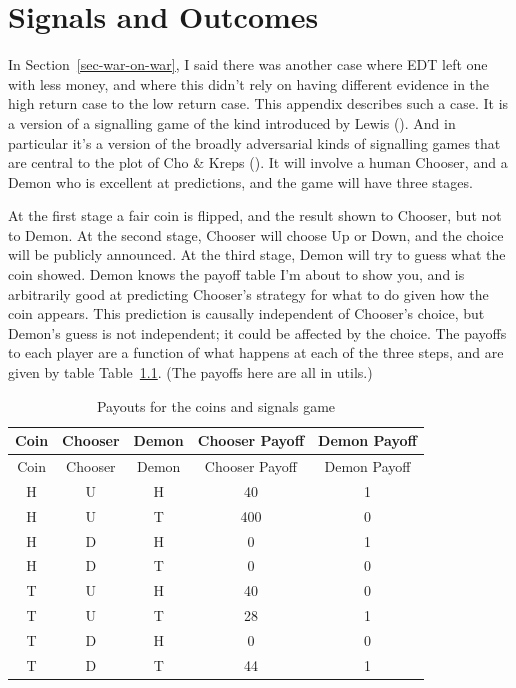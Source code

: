 \documentclass[
  12pt,
  letterpaper,
  DIV=11,
  numbers=noendperiod]{scrreprt}
\begin{document}
\chapter{Signals and Outcomes}\label{sec-war-signal}

In Section~\ref{sec-war-on-war}, I said there was another case where EDT
left one with less money, and where this didn't rely on having different
evidence in the high return case to the low return case. This appendix
describes such a case. It is a version of a signalling game of the kind
introduced by Lewis (). And in particular
it's a version of the broadly adversarial kinds of signalling games that
are central to the plot of Cho \& Kreps
(). It will involve a human Chooser,
and a Demon who is excellent at predictions, and the game will have
three stages.

At the first stage a fair coin is flipped, and the result shown to
Chooser, but not to Demon. At the second stage, Chooser will choose Up
or Down, and the choice will be publicly announced. At the third stage,
Demon will try to guess what the coin showed. Demon knows the payoff
table I'm about to show you, and is arbitrarily good at predicting
Chooser's strategy for what to do given how the coin appears. This
prediction is causally independent of Chooser's choice, but Demon's
guess is not independent; it could be affected by the choice. The
payoffs to each player are a function of what happens at each of the
three steps, and are given by table Table~\ref{tbl-payoffs-demon-coin}.
(The payoffs here are all in utils.)

\begin{longtable}[]{@{}ccccc@{}}
\caption{Payouts for the coins and signals
game}\label{tbl-payoffs-demon-coin}\tabularnewline
\toprule\noalign{}
Coin & Chooser & Demon & Chooser Payoff & Demon Payoff \\
\midrule\noalign{}
\endfirsthead
\toprule\noalign{}
Coin & Chooser & Demon & Chooser Payoff & Demon Payoff \\
\midrule\noalign{}
\endhead
\bottomrule\noalign{}
\endlastfoot
H & U & H & 40 & 1 \\
H & U & T & 400 & 0 \\
H & D & H & 0 & 1 \\
H & D & T & 0 & 0 \\
T & U & H & 40 & 0 \\
T & U & T & 28 & 1 \\
T & D & H & 0 & 0 \\
T & D & T & 44 & 1 \\
\end{longtable}
\end{document}
